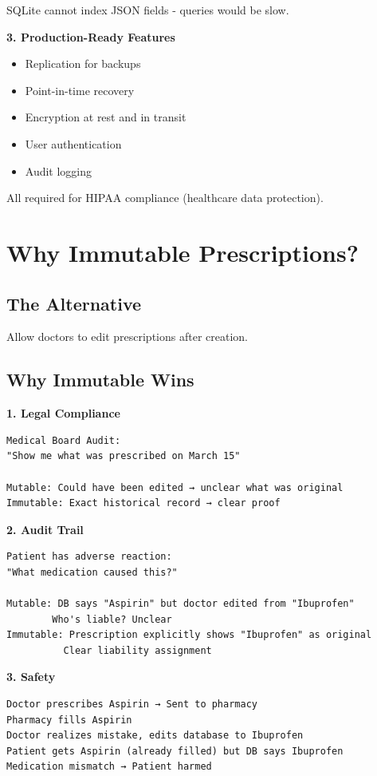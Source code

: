 \documentclass[11pt,a4paper,twoside]{report}
\begin{document}
SQLite cannot index JSON fields - queries would be slow.

\textbf{3. Production-Ready Features}

\begin{itemize}
    \item Replication for backups
    \item Point-in-time recovery
    \item Encryption at rest and in transit
    \item User authentication
    \item Audit logging
\end{itemize}

All required for HIPAA compliance (healthcare data protection).

\section{Why Immutable Prescriptions?}

\subsection{The Alternative}
Allow doctors to edit prescriptions after creation.

\subsection{Why Immutable Wins}

\textbf{1. Legal Compliance}

\begin{verbatim}
Medical Board Audit:
"Show me what was prescribed on March 15"

Mutable: Could have been edited → unclear what was original
Immutable: Exact historical record → clear proof
\end{verbatim}

\textbf{2. Audit Trail}

\begin{verbatim}
Patient has adverse reaction:
"What medication caused this?"

Mutable: DB says "Aspirin" but doctor edited from "Ibuprofen"
        Who's liable? Unclear
Immutable: Prescription explicitly shows "Ibuprofen" as original
          Clear liability assignment
\end{verbatim}

\textbf{3. Safety}

\begin{verbatim}
Doctor prescribes Aspirin → Sent to pharmacy
Pharmacy fills Aspirin
Doctor realizes mistake, edits database to Ibuprofen
Patient gets Aspirin (already filled) but DB says Ibuprofen
Medication mismatch → Patient harmed
\end{verbatim}
\end{document}
